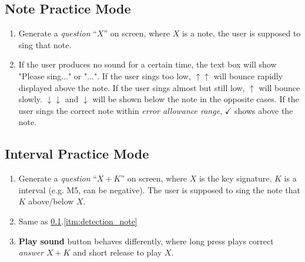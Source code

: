 \documentclass{article}
\begin{document}
\subsection{Note Practice Mode}
\label{subsec:note_practice_mode}
\begin{enumerate}
  \item\label{itm:question_note} Generate a \textit{question} ``$X$'' on screen, where $X$ is a note, the user is supposed to sing that note. 
  \item\label{itm:detection_note} If the user produces no sound for a certain time, the text box will show "Please sing..." or "...". If the user sings too low, $\uparrow\uparrow$ will bounce rapidly displayed above the note. If the user sings almost but still low, $\uparrow$ will bounce slowly. $\downarrow\downarrow$ and $\downarrow$ will be shown below the note in the opposite cases. If the user sings the correct note within \textit{error allowance range}, $\checkmark$ shows above the note.

\end{enumerate}

\subsection{Interval Practice Mode}
\label{subsec:interval_practice_mode}
\begin{enumerate}
  \item \label{itm:question_interval} Generate a \textit{question} ``$X + K$'' on screen, where $X$ is the key signature, $K$ is a interval (e.g. M5, can be negative). The user is supposed to sing the note that $K$ above/below $X$.
  \item \label{itm:detection_interval} Same as \ref{subsec:note_practice_mode}.\ref{itm:detection_note}
  \item \label{itm:play_sound_interval} \textbf{Play sound} button behaves differently, where long press plays correct \textit{answer} $X+K$ and short release to play $X$.

\end{enumerate}
\end{document}
